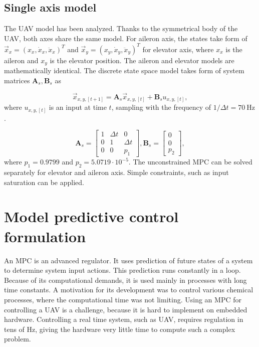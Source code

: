 \documentclass[a4paper,11pt,titlepage]{article}
\newcommand{\jed}[1]{\ensuremath{~\mathrm{#1}}}
\begin{document}


\subsection{Single axis model}
The UAV model has been analyzed\cite{tomas}. Thanks to the symmetrical body of the UAV, both axes share the same model. For aileron axis, the states take form of $\vec{x}_x = (x_x, \dot{x}_x, \ddot{x}_x)^T$ and $\vec{x}_y = (x_y, \dot{x}_y, \ddot{x}_y)^T$ for elevator axis, where $x_x$ is the aileron and $x_y$ is the elevator position. The aileron and elevator models are mathematically identical. The discrete state space model takes form of system matrices $\textbf{A}_s, \textbf{B}_s$ as

\begin{equation}
\label{eq:state_space_model_simple}
\vec{x}_{x,y,[t+1]} = \textbf{A}_{s} \vec{x}_{x,y, [t]} +\textbf{B}_{s} u_{x,y, [t]},
\end{equation} 
where $u_{x,y,[t]}$ is an input at time $t$, sampling with the frequency of $1/\Delta t = 70\jed{Hz}$.

\begin{equation}
\textbf{A}_{s} =
  \begin{bmatrix}
  1 & \Delta t & 		0 \\
  0 & 		 1 & \Delta t \\
  0	& 		 0 &		p_1
  \end{bmatrix},\textbf{B}_{s} = \begin{bmatrix}
  0 \\
  0 \\
  p_2
  \end{bmatrix}, 
\end{equation}
where $p_1 = 0.9799$ and $p_2 = 5.0719\cdot10^{-5}$. The unconstrained MPC can be solved separately for elevator and aileron axis. Simple constraints, such as input saturation can be applied.

\section{Model predictive control formulation}
\label{sec:Model_predictive_control_formulation}

An MPC is an advanced regulator. It uses prediction of future states of a system to determine system input actions. This prediction runs constantly in a loop. Because of its computational demands, it is used mainly in processes with long time constants. A motivation for its development was to control various chemical processes, where the computational time was not limiting. Using an MPC for controlling a UAV is a challenge, because it is hard to implement on embedded hardware. Controlling a real time system, such as UAV, requires regulation in tens of Hz, giving the hardware very little time to compute such a complex problem.
\end{document}
